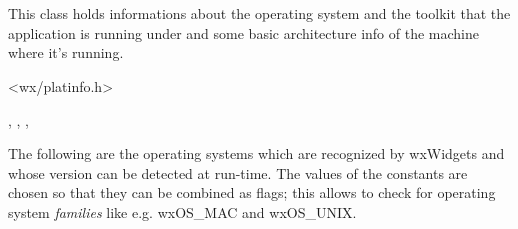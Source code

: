 
\section{}\label{wxplatforminfo}

This class holds informations about the operating system and the toolkit that the application
is running under and some basic architecture info of the machine where it's running.




<wx/platinfo.h>


, ,
, 


The following are the operating systems which are recognized by wxWidgets
and whose version can be detected at run-time. The values of the constants
are chosen so that they can be combined as flags; this allows to check
for operating system {\it families} like e.g. wxOS\_MAC and wxOS\_UNIX.


